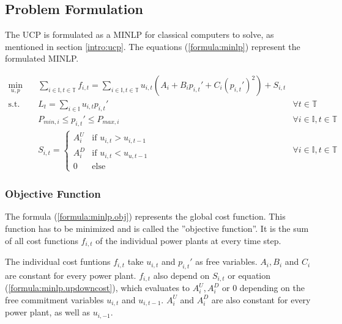 \subsection{Problem Formulation}

The UCP is formulated as a MINLP for classical computers to solve,
as mentioned in section \ref{intro:ucp}.
The equations (\ref{formula:minlp}) represent the formulated MINLP.

\begin{subequations}
\begin{align}
  \min_{u, p} \quad &
  \sum_{i \in \mathbb{I}, t \in \mathbb{T}} f_{i, t}
  = \sum_{i \in \mathbb{I}, t \in \mathbb{T}}
    u_{i, t} (A_i + B_i p_{i, t}' + C_i (p_{i, t}')^2) + S_{i, t}
  \label{formula:minlp.obj} \\
  \text{s.t.} \quad & L_t = \sum_{i \in \mathbb{I}} u_{i, t} p_{i, t}' \quad &
  \forall t \in \mathbb{T}
  \label{formula:minlp.load} \\
  &
  P_{min, i} \leq p_{i, t}' \leq P_{max, i} \quad &
  \forall i \in \mathbb{I}, t \in \mathbb{T}
  \label{formula:minlp.power} \\
  &
  S_{i, t} = \begin{cases}
    A_i^U & \text{if } u_{i, t} > u_{i, t-1} \\
    A_i^D & \text{if } u_{i, t} < u_{u, t-1} \\
    0 & \text{else}
  \end{cases} \quad &
  \forall i \in \mathbb{I}, t \in \mathbb{T}
  \label{formula:minlp.updowncost}
\end{align}
\label{formula:minlp}
\end{subequations}

\subsubsection{Objective Function}

The formula (\ref{formula:minlp.obj}) represents the global cost function.
This function has to be minimized and is called the ''objective function''.
It is the sum of all cost functions $f_{i, t}$ of the individual power plants at every time step.

The individual cost funtions $f_{i, t}$ take $u_{i, t}$ and $p_{i, t}'$ as free variables.
$A_i, B_i$ and $C_i$ are constant for every power plant.
$f_{i, t}$ also depend on $S_{i, t}$ or equation (\ref{formula:minlp.updowncost}),
which evaluates to $A_i^U, A_i^D$ or $0$ depending on the free commitment variables $u_{i, t}$ and $u_{i, t-1}$.
$A_i^U$ and $A_i^D$ are also constant for every power plant,
as well as $u_{i, -1}$.

